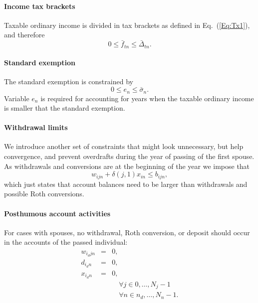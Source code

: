 \documentclass{report}[fleqn,11pt]
\begin{document}
\paragraph*{Income tax brackets}
	Taxable ordinary income is divided in tax brackets as defined in Eq.~(\ref{Eq:Tx1}),
	and therefore
	\begin{equation}
		\label{Eq:C2}
		0 \le \bar{f}_{tn} \le \bar{\Delta}_{tn}.
	\end{equation}

\paragraph*{Standard exemption}
	The standard exemption is constrained by
	\begin{equation}
		0 \le e_n \le \bar{\sigma}_n.
	\end{equation}
	Variable $e_n$ is required for accounting for years when the taxable ordinary
	income is smaller that the standard exemption.

\paragraph*{Withdrawal limits}
	We introduce another set of constraints that might look unnecessary, but help
	convergence, and prevent overdrafts during the year of passing of the first spouse.
	As withdrawals and conversions are at the beginning of the year 
	we impose that
	\begin{equation}
		w_{ijn} + \delta(j, 1)x_{in} \le b_{ijn},
	\end{equation}
	which just states that account balances need to be larger than withdrawals and possible Roth conversions.

\paragraph*{Posthumous account activities}
	For cases with spouses, no withdrawal, Roth conversion, or deposit should
	occur in the accounts of the passed individual:
	\begin{eqnarray}
		w_{i_djn} &=& 0,\nonumber\\
		d_{i_dn} &=& 0, \nonumber \\
		x_{i_dn} &=& 0, \nonumber \\
		&& \quad \forall j \in {0, \ldots, N_j-1} \nonumber \\
		&& \quad \forall n \in {n_d, \ldots, N_n-1}.
	\end{eqnarray}
\end{document}
